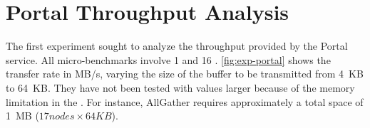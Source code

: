 	\section{Portal Throughput Analysis}



		The first experiment sought to analyze the throughput provided by the
		Portal service. All micro-benchmarks involve 1 \iocluster and 16 \ccluters.
		\autoref{fig:exp-portal} shows the transfer rate in MB/s, varying the size
		of the buffer to be transmitted from 4~KB to 64~KB. They have not been
		tested with values ​​larger because of the memory limitation in the \ccluters.
		For instance, AllGather requires approximately a total space of 1~MB ($17 nodes \times 64 KB$).

